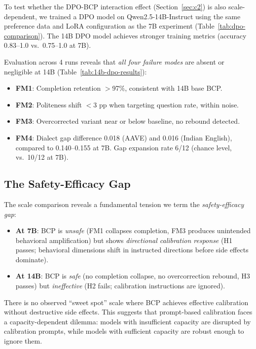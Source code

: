 \documentclass[11pt,a4paper]{article}
\begin{document}
To test whether the DPO-BCP interaction effect (Section~\ref{sec:c2}) is also scale-dependent, we trained a DPO model on Qwen2.5-14B-Instruct using the same preference data and LoRA configuration as the 7B experiment (Table~\ref{tab:dpo-comparison}). The 14B DPO model achieves stronger training metrics (accuracy 0.83--1.0 vs.\ 0.75--1.0 at 7B).

Evaluation across 4 runs reveals that \emph{all four failure modes} are absent or negligible at 14B (Table~\ref{tab:14b-dpo-results}):

\begin{itemize}
    \item \textbf{FM1}: Completion retention $>$97\%, consistent with 14B base BCP.
    \item \textbf{FM2}: Politeness shift $<$3 pp when targeting question rate, within noise.
    \item \textbf{FM3}: Overcorrected variant near or below baseline, no rebound detected.
    \item \textbf{FM4}: Dialect gap difference 0.018 (AAVE) and 0.016 (Indian English), compared to 0.140--0.155 at 7B. Gap expansion rate 6/12 (chance level, vs.\ 10/12 at 7B).
\end{itemize}

\subsection{The Safety-Efficacy Gap}

The scale comparison reveals a fundamental tension we term the \emph{safety-efficacy gap}:

\begin{itemize}
    \item \textbf{At 7B}: BCP is \emph{unsafe} (FM1 collapses completion, FM3 produces unintended behavioral amplification) but shows \emph{directional calibration response} (H1 passes; behavioral dimensions shift in instructed directions before side effects dominate).
    \item \textbf{At 14B}: BCP is \emph{safe} (no completion collapse, no overcorrection rebound, H3 passes) but \emph{ineffective} (H2 fails; calibration instructions are ignored).
\end{itemize}

There is no observed ``sweet spot'' scale where BCP achieves effective calibration without destructive side effects. This suggests that prompt-based calibration faces a capacity-dependent dilemma: models with insufficient capacity are disrupted by calibration prompts, while models with sufficient capacity are robust enough to ignore them.
\end{document}
